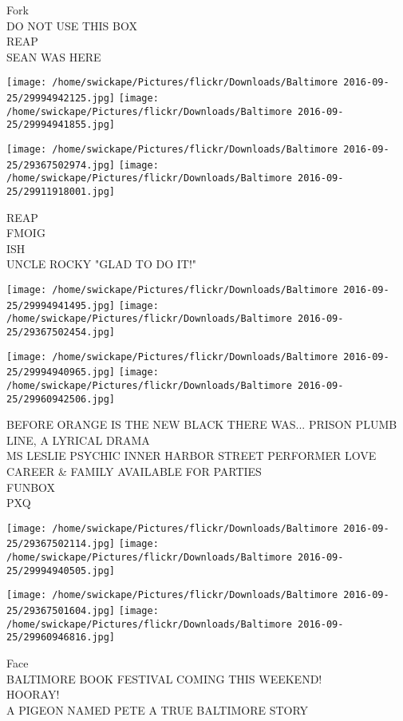 \documentclass[10pt,letterpaper]{article}
\begin{document}
Fork\\
DO NOT USE THIS BOX\\
REAP\\
SEAN WAS HERE
\pagebreak

\texttt{[image: /home/swickape/Pictures/flickr/Downloads/Baltimore 2016-09-25/29994942125.jpg]}
\texttt{[image: /home/swickape/Pictures/flickr/Downloads/Baltimore 2016-09-25/29994941855.jpg]}

\texttt{[image: /home/swickape/Pictures/flickr/Downloads/Baltimore 2016-09-25/29367502974.jpg]}
\texttt{[image: /home/swickape/Pictures/flickr/Downloads/Baltimore 2016-09-25/29911918001.jpg]}

REAP\\
FMOIG\\
ISH\\
UNCLE ROCKY "GLAD TO DO IT!"
\pagebreak

\texttt{[image: /home/swickape/Pictures/flickr/Downloads/Baltimore 2016-09-25/29994941495.jpg]}
\texttt{[image: /home/swickape/Pictures/flickr/Downloads/Baltimore 2016-09-25/29367502454.jpg]}

\texttt{[image: /home/swickape/Pictures/flickr/Downloads/Baltimore 2016-09-25/29994940965.jpg]}
\texttt{[image: /home/swickape/Pictures/flickr/Downloads/Baltimore 2016-09-25/29960942506.jpg]}

BEFORE ORANGE IS THE NEW BLACK THERE WAS... PRISON PLUMB LINE, A LYRICAL DRAMA\\
MS LESLIE PSYCHIC INNER HARBOR STREET PERFORMER LOVE CAREER \& FAMILY AVAILABLE FOR PARTIES\\
FUNBOX\\
PXQ
\pagebreak

\texttt{[image: /home/swickape/Pictures/flickr/Downloads/Baltimore 2016-09-25/29367502114.jpg]}
\texttt{[image: /home/swickape/Pictures/flickr/Downloads/Baltimore 2016-09-25/29994940505.jpg]}

\texttt{[image: /home/swickape/Pictures/flickr/Downloads/Baltimore 2016-09-25/29367501604.jpg]}
\texttt{[image: /home/swickape/Pictures/flickr/Downloads/Baltimore 2016-09-25/29960946816.jpg]}

Face\\
BALTIMORE BOOK FESTIVAL COMING THIS WEEKEND!\\
HOORAY!\\
A PIGEON NAMED PETE A TRUE BALTIMORE STORY
\pagebreak
\end{document}
